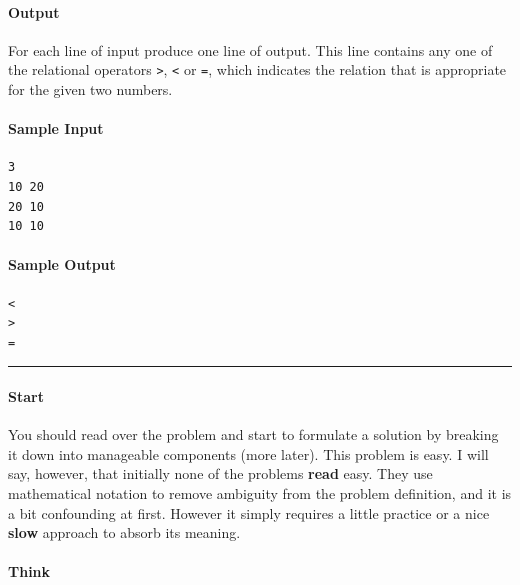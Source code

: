 \hypertarget{output}{%
\paragraph{Output}\label{output}}

For each line of input produce one line of output. This line contains
any one of the relational operators \texttt{\textgreater{}},
\texttt{\textless{}} or \texttt{=}, which indicates the relation that is
appropriate for the given two numbers.

\hypertarget{sample-input}{%
\paragraph{Sample Input}\label{sample-input}}

\begin{verbatim}
3
10 20
20 10
10 10
\end{verbatim}

\hypertarget{sample-output}{%
\paragraph{Sample Output}\label{sample-output}}

\begin{verbatim}
<
>
=
\end{verbatim}

\begin{center}\rule{0.5\linewidth}{0.5pt}\end{center}

\hypertarget{coding-the-problem}{%
\label{coding-the-problem}}

\hypertarget{start}{%
\paragraph{Start}\label{start}}

You should read over the problem and start to formulate a solution by
breaking it down into manageable components (more later). This problem
is easy. I will say, however, that initially none of the problems
\textbf{read} easy. They use mathematical notation to remove ambiguity
from the problem definition, and it is a bit confounding at first.
However it simply requires a little practice or a nice \textbf{slow}
approach to absorb its meaning.

\hypertarget{think}{%
\paragraph{Think}\label{think}}

